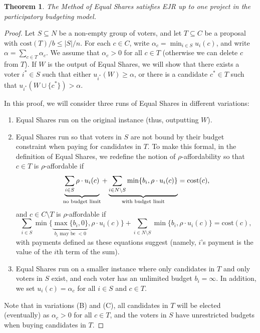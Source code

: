 \documentclass[10pt]{scrartcl}
\renewcommand*{\le}{\leqslant}
\renewcommand*{\ge}{\geqslant}
\newcommand{\cost}{{{\mathrm{cost}}}}
\theoremstyle{definition}
\theoremstyle{plain}
\newtheorem{theorem}{Theorem}
\begin{document}
\begin{theorem}\label{thm:rule_x_and_ejr_cardinal}
	The Method of Equal Shares satisfies EJR up to one project in the participatory budgeting model.
\end{theorem}
\begin{proof}
	Let $S \subseteq N$ be a non-empty group of voters, and let $T \subseteq C$ be a proposal with $\cost(T)/b \le |S|/n$. For each $c \in C$, write $\alpha_c = \min_{i\in S} u_i(c)$, and write $\alpha = \sum_{c \in T} \alpha_c$. We assume that $\alpha_c > 0$ for all $c \in T$ (otherwise we can delete $c$ from $T$). If $W$ is the output of Equal Shares, we will show that there exists a voter $i^* \in S$ such that either $u_{i^*}(W) \ge \alpha$, or there is a candidate $c^* \in T$ such that $u_{i^*}(W \cup \{c^*\}) > \alpha$.
	
	In this proof, we will consider three runs of Equal Shares in different variations:
	\begin{enumerate}
		\item[(A)] Equal Shares run on the original instance (thus, outputting $W$).
		\item[(B)] Equal Shares run so that voters in $S$ are not bound by their budget constraint when paying for candidates in $T$. To make this formal, in the definition of Equal Shares, we redefine the notion of $\rho$-affordability so that $c \in T$ is $\rho$-affordable if
		\begin{equation}
			\label{eq:Baffordable-definition}
			\underbrace{\sum_{i \in S \vphantom{\setminus}} \rho \cdot u_i(c)}_{\text{no budget limit}} + \underbrace{\sum_{i \in N \setminus S} \min\{b_i, \rho \cdot u_i(c)\}}_{\text{with budget limit}} = \cost(c),
		\end{equation}
		and $c \in C \setminus T$ is $\rho$-affordable if
		\[
		\sum_{i \in S} \min\{ \underbrace{\max\{b_i, 0\}}_{\text{$b_i$ may be $<0$}}, \rho \cdot u_i(c)\} + \sum_{i \in N \setminus S} \min\{b_i, \rho \cdot u_i(c)\} = \cost(c),
		\]
		with payments defined as these equations suggest (namely, $i$'s payment is the value of the $i$th term of the sum).
		\item[(C)] Equal Shares run on a smaller instance where only candidates in $T$ and only voters in $S$ exist, and each voter has an unlimited budget $b_i = \infty$. In addition, we set $u_i(c) = \alpha_c$ for all $i \in S$ and $c \in T$.
	\end{enumerate}
	Note that in variations (B) and (C), all candidates in $T$ will be elected (eventually) as $\alpha_c > 0$ for all $c \in T$, and the voters in $S$ have unrestricted budgets when buying candidates in $T$.
	

\end{proof}
\end{document}
